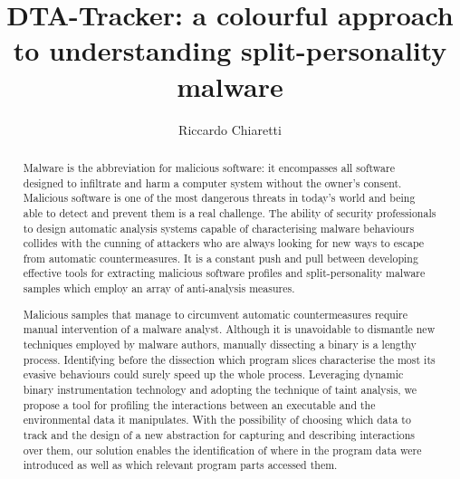 \documentclass[LaM,binding=0.6cm]{sapthesis}
\title{DTA-Tracker: a colourful approach to understanding split-personality malware}
\author{Riccardo Chiaretti}
\begin{document}
\frontmatter
\maketitle

\dedication{Dedicated to to my parents and my brother, \\without their support I would never have achieved this goal.}

\begin{abstract}
Malware is the abbreviation for malicious software: it encompasses all software designed to infiltrate and harm a computer system without the owner's consent. Malicious software is one of the most dangerous threats in today's world and being able to detect and prevent them is a real challenge. The ability of security professionals to design automatic analysis systems capable of characterising malware behaviours collides with the cunning of attackers who are always looking for new ways to escape from automatic countermeasures. It is a constant push and pull between developing effective tools for extracting malicious software profiles and split-personality malware samples which employ an array of anti-analysis measures.

Malicious samples that manage to circumvent automatic countermeasures require manual intervention of a malware analyst. Although it is unavoidable to dismantle new techniques employed by malware authors, manually dissecting a binary is a lengthy process. Identifying before the dissection which program slices characterise the most its evasive behaviours could surely speed up the whole process. Leveraging dynamic binary instrumentation technology and adopting the technique of taint analysis, we propose a tool for profiling the interactions between an executable and the environmental data it manipulates. With the possibility of choosing which data to track and the design of a new abstraction for capturing and describing interactions over them, our solution enables the identification of where in the program data were introduced as well as which relevant program parts accessed them. 
\end{abstract}
\end{document}
